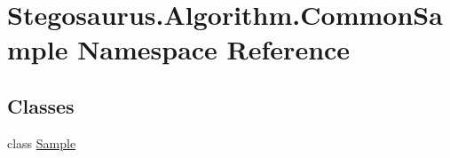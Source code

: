\hypertarget{namespace_stegosaurus_1_1_algorithm_1_1_common_sample}{}\section{Stegosaurus.\+Algorithm.\+Common\+Sample Namespace Reference}
\label{namespace_stegosaurus_1_1_algorithm_1_1_common_sample}
\subsection*{Classes}
\begin{DoxyCompactItemize}
\item 
class \hyperlink{class_stegosaurus_1_1_algorithm_1_1_common_sample_1_1_sample}{Sample}
\end{DoxyCompactItemize}
